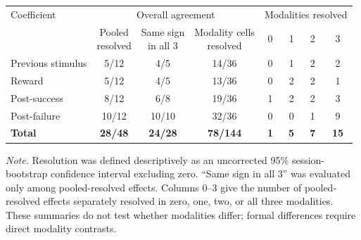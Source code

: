 \documentclass[border=8pt]{standalone}
\begin{document}
\begin{minipage}{720pt}
\centering
{}
\vspace{3pt}
\begin{tabular}{lccccccc}
\toprule
Coefficient & \multicolumn{3}{c}{Overall agreement} & \multicolumn{4}{c}{Modalities resolved} \\
\cmidrule(lr){2-4}\cmidrule(lr){5-8}
 & \shortstack{Pooled\\resolved} & \shortstack{Same sign\\in all 3} & \shortstack{Modality cells\\resolved} & 0 & 1 & 2 & 3 \\
\midrule
Previous stimulus & 5/12 & 4/5 & 14/36 & 0 & 1 & 2 & 2 \\
Reward & 5/12 & 4/5 & 13/36 & 0 & 2 & 2 & 1 \\
Post-success & 8/12 & 6/8 & 19/36 & 1 & 2 & 2 & 3 \\
Post-failure & 10/12 & 10/10 & 32/36 & 0 & 0 & 1 & 9 \\
\midrule
\textbf{Total} & \textbf{28/48} & \textbf{24/28} & \textbf{78/144} & \textbf{1} & \textbf{5} & \textbf{7} & \textbf{15} \\
\bottomrule
\end{tabular}
\vspace{6pt}
\par\small\raggedright
\textit{Note.} Resolution was defined descriptively as an uncorrected 95\% session-bootstrap confidence interval excluding zero. ``Same sign in all 3'' was evaluated only among pooled-resolved effects. Columns 0--3 give the number of pooled-resolved effects separately resolved in zero, one, two, or all three modalities. These summaries do not test whether modalities differ; formal differences require direct modality contrasts.
\end{minipage}
\end{document}
